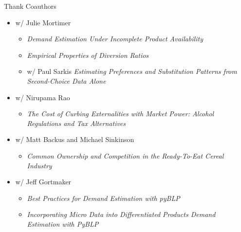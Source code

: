 \begin{frame}{Thank Coauthors}
\begin{itemize}
    \item w/ Julie Mortimer

    \begin{itemize}
        \item \textit{Demand Estimation Under Incomplete Product Availability}
        \item \textit {Empirical Properties of Diversion Ratios}
        \item w/ Paul Sarkis \textit{Estimating Preferences and Substitution Patterns from Second-Choice Data Alone }
    \end{itemize}

    \item w/ Nirupama Rao

    \begin{itemize}
        \item \textit{The Cost of Curbing Externalities with Market Power: Alcohol Regulations and Tax Alternatives}
    \end{itemize}

    \item w/ Matt Backus and Michael Sinkinson

    \begin{itemize}
        \item \textit{Common Ownership and Competition in the Ready-To-Eat Cereal Industry}
    \end{itemize}

    \item w/ Jeff Gortmaker 
    \begin{itemize}
        \item \textit{Best Practices for Demand Estimation with pyBLP}
        \item \textit{Incorporating Micro Data into Differentiated Products Demand Estimation with PyBLP}
    \end{itemize}

\end{itemize}
\end{frame}

